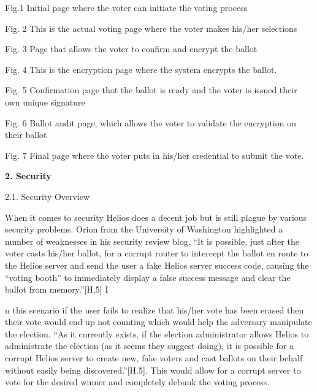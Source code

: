 Fig.1 Initial page where the voter can initiate the voting process


Fig. 2 This is the actual voting page where the voter makes his/her selections


\bigskip


Fig. 3 Page that allows the voter to confirm and encrypt the ballot


Fig. 4 This is the encryption page where the system encrypts the ballot.


Fig. 5 Confirmation page that the ballot is ready and the voter is issued their own unique signature


\bigskip


Fig. 6 Ballot audit page, which allows the voter to validate the encryption on their ballot


Fig. 7 Final page where the voter puts in his/her credential to submit the vote.

\textbf{2. Security}

2.1. Security Overview

When it comes to security Helios does a decent job but is still plague by various security problems. Orion from the University of Washington highlighted a number of weaknesses in his security review blog. ``It is possible, just after the voter casts his/her ballot, for a corrupt router to intercept the ballot en route to the Helios server and send the user a fake Helios server success code, causing the ``voting booth'' to immediately display a false success message and clear the ballot from memory.''[H.5] I

n this scenario if the user fails to realize that his/her vote has been erased then their vote would end up not counting which would help the adversary manipulate the election. ``As it currently exists, if the election administrator allows Helios to administrate the election (as it seems they suggest doing), it is possible for a corrupt Helios server to create new, fake voters and cast ballots on their behalf without easily being discovered.''[H.5]. This would allow for a corrupt server to vote for the desired winner and completely debunk the voting process.

